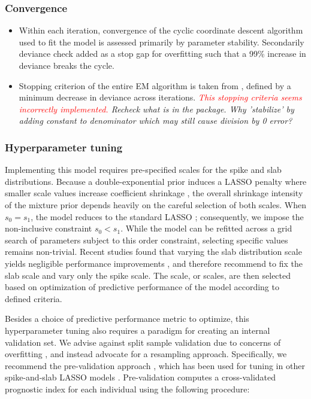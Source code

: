 \documentclass[11pt,a4paper]{article}
\let\cite\parencite
\begin{document}
\subsubsection{Convergence}
\begin{itemize}
    \item Within each iteration, convergence of the cyclic coordinate descent algorithm used to fit the model is assessed primarily by parameter stability. Secondarily deviance check added as a stop gap for overfitting such that a 99\% increase in deviance breaks the cycle.
    \item Stopping criterion of the entire EM algorithm is taken from \cite{Tang2017}, defined by a minimum decrease in deviance across iterations. \textit{\textcolor{red}{This stopping criteria seems incorrectly implemented. }Recheck what is in the package. Why 'stabilize' by adding constant to denominator which may still cause division by 0 error?}
\end{itemize}

\subsubsection{Hyperparameter tuning}
Implementing this model requires pre-specified scales for the spike and slab distributions. Because a double-exponential prior induces a LASSO penalty where smaller scale values increase coefficient shrinkage \cite{Tibshirani1997}, the overall shrinkage intensity of the mixture prior depends heavily on the careful selection of both scales. When $s_0 = s_1$, the model reduces to the standard LASSO \cite{RockovaGeorge2018}; consequently, we impose the non-inclusive constraint $s_0 < s_1$. While the model can be refitted across a grid search of parameters subject to this order constraint, selecting specific values remains non-trivial. Recent studies found that varying the slab distribution scale yields negligible performance improvements \cite{Tang2017, Tang2019, Bai2020}, and therefore recommend to fix the slab scale and vary only the spike scale. The scale, or scales, are then selected based on optimization of predictive performance of the model according to defined criteria.

Besides a choice of predictive performance metric to optimize, this hyperparameter tuning also requires a paradigm for creating an internal validation set. We advise against split sample validation due to concerns of overfitting \cite{Collins2024, Steyerberg2018}, and instead advocate for a resampling approach. Specifically, we recommend the pre-validation approach \cite{TibshiraniEfron2002, Hastie2015}, which has been used for tuning in other spike-and-slab LASSO models \cite{Tang2017, Tang2019, Yi2019, GuoYi2022}. Pre-validation computes a cross-validated prognostic index for each individual using the following procedure:
\end{document}
